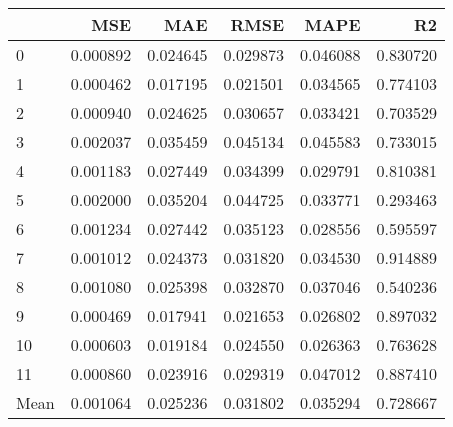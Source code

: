 \begin{tabular}{lrrrrr}
\toprule
 & MSE & MAE & RMSE & MAPE & R2 \\
\midrule
0 & 0.000892 & 0.024645 & 0.029873 & 0.046088 & 0.830720 \\
1 & 0.000462 & 0.017195 & 0.021501 & 0.034565 & 0.774103 \\
2 & 0.000940 & 0.024625 & 0.030657 & 0.033421 & 0.703529 \\
3 & 0.002037 & 0.035459 & 0.045134 & 0.045583 & 0.733015 \\
4 & 0.001183 & 0.027449 & 0.034399 & 0.029791 & 0.810381 \\
5 & 0.002000 & 0.035204 & 0.044725 & 0.033771 & 0.293463 \\
6 & 0.001234 & 0.027442 & 0.035123 & 0.028556 & 0.595597 \\
7 & 0.001012 & 0.024373 & 0.031820 & 0.034530 & 0.914889 \\
8 & 0.001080 & 0.025398 & 0.032870 & 0.037046 & 0.540236 \\
9 & 0.000469 & 0.017941 & 0.021653 & 0.026802 & 0.897032 \\
10 & 0.000603 & 0.019184 & 0.024550 & 0.026363 & 0.763628 \\
11 & 0.000860 & 0.023916 & 0.029319 & 0.047012 & 0.887410 \\
Mean & 0.001064 & 0.025236 & 0.031802 & 0.035294 & 0.728667 \\
\bottomrule
\end{tabular}
